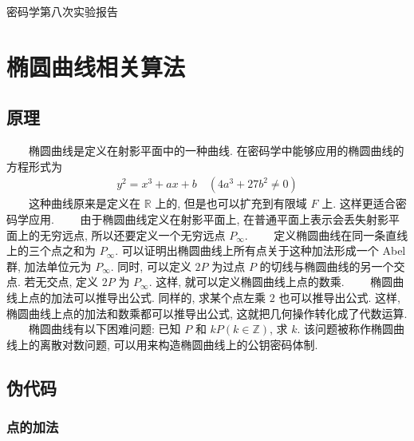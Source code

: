 \documentclass[12pt,a4paper]{article}
\begin{document}
{
\titlefont
\begin{center}
密码学第八次实验报告
\end{center}
}

\section*{椭圆曲线相关算法}

\subsection*{原理}

　　椭圆曲线是定义在射影平面中的一种曲线. 在密码学中能够应用的椭圆曲线的方程形式为
\begin{align*}
y^2 = x^3 + ax + b \quad (4 a^3 + 27 b^2 \neq 0)
\end{align*}
\noindent
　　这种曲线原来是定义在 $ \mathbb{R} $ 上的, 但是也可以扩充到有限域 $ F $ 上. 这样更适合密码学应用. 
\newline
　　由于椭圆曲线定义在射影平面上, 在普通平面上表示会丢失射影平面上的无穷远点, 所以还要定义一个无穷远点 $ P_{\infty} $. 
\newline
　　定义椭圆曲线在同一条直线上的三个点之和为 $ P_{\infty} $. 可以证明出椭圆曲线上所有点关于这种加法形成一个 Abel 群, 加法单位元为 $ P_{\infty} $. 同时, 可以定义 $ 2P $ 为过点 $ P $ 的切线与椭圆曲线的另一个交点. 若无交点, 定义 $ 2P $ 为 $ P_{\infty} $. 这样, 就可以定义椭圆曲线上点的数乘. 
\newline
　　椭圆曲线上点的加法可以推导出公式. 同样的, 求某个点左乘 $ 2 $ 也可以推导出公式. 这样, 椭圆曲线上点的加法和数乘都可以推导出公式, 这就把几何操作转化成了代数运算. 
\newline
　　椭圆曲线有以下困难问题: 已知 $ P $ 和 $ kP (k \in \mathbb{Z} ) $, 求 $ k $. 该问题被称作椭圆曲线上的离散对数问题, 可以用来构造椭圆曲线上的公钥密码体制.

\subsection*{伪代码}

\subsubsection*{点的加法}
\end{document}
